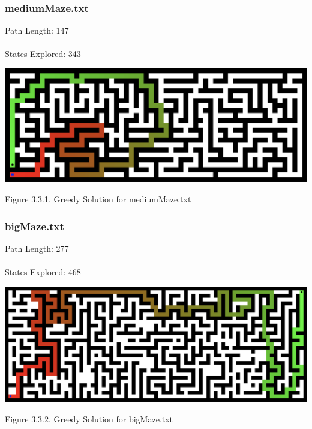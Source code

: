 \documentclass{mcmthesis}
\begin{document}
\subsubsection{mediumMaze.txt}
Path Length: 147 \\ \\
States Explored: 343
\begin{center}
\includegraphics[width=15cm]{greedy_mediummaze.png}
\end{center}
\begin{center}
\small{Figure 3.3.1. Greedy Solution for mediumMaze.txt}
\end{center}

\subsubsection{bigMaze.txt}
Path Length: 277 \\ \\
States Explored: 468
\begin{center}
\includegraphics[width=15cm]{greedy_bigmaze.png}
\end{center}
\begin{center}
\small{Figure 3.3.2. Greedy Solution for bigMaze.txt}
\end{center}
\end{document}
